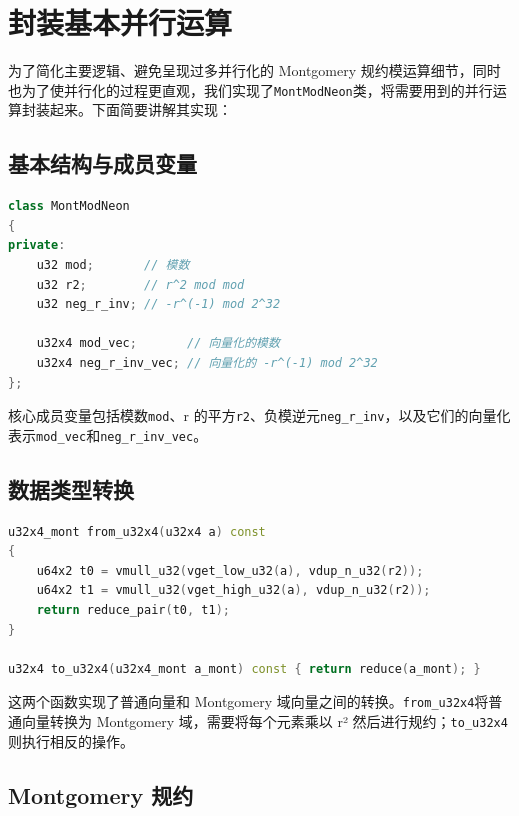 \documentclass[a4paper]{article}
\begin{document}
\section{封装基本并行运算}\label{sec:parallel_ops}

为了简化主要逻辑、避免呈现过多并行化的 Montgomery 规约模运算细节，同时也为了使并行化的过程更直观，我们实现了\texttt{MontModNeon}类，将需要用到的并行运算封装起来。下面简要讲解其实现：

\subsection{基本结构与成员变量}

\begin{lstlisting}[language=C++]
class MontModNeon
{
private:
    u32 mod;       // 模数
    u32 r2;        // r^2 mod mod
    u32 neg_r_inv; // -r^(-1) mod 2^32

    u32x4 mod_vec;       // 向量化的模数
    u32x4 neg_r_inv_vec; // 向量化的 -r^(-1) mod 2^32
};
\end{lstlisting}

核心成员变量包括模数\texttt{mod}、r 的平方\texttt{r2}、负模逆元\texttt{neg\_r\_inv}，以及它们的向量化表示\texttt{mod\_vec}和\texttt{neg\_r\_inv\_vec}。

\subsection{数据类型转换}

\begin{lstlisting}[language=C++]
u32x4_mont from_u32x4(u32x4 a) const
{
    u64x2 t0 = vmull_u32(vget_low_u32(a), vdup_n_u32(r2));
    u64x2 t1 = vmull_u32(vget_high_u32(a), vdup_n_u32(r2));
    return reduce_pair(t0, t1);
}

u32x4 to_u32x4(u32x4_mont a_mont) const { return reduce(a_mont); }
\end{lstlisting}

这两个函数实现了普通向量和 Montgomery 域向量之间的转换。\texttt{from\_u32x4}将普通向量转换为 Montgomery 域，需要将每个元素乘以 r² 然后进行规约；\texttt{to\_u32x4}则执行相反的操作。

\subsection{Montgomery 规约}
\end{document}

